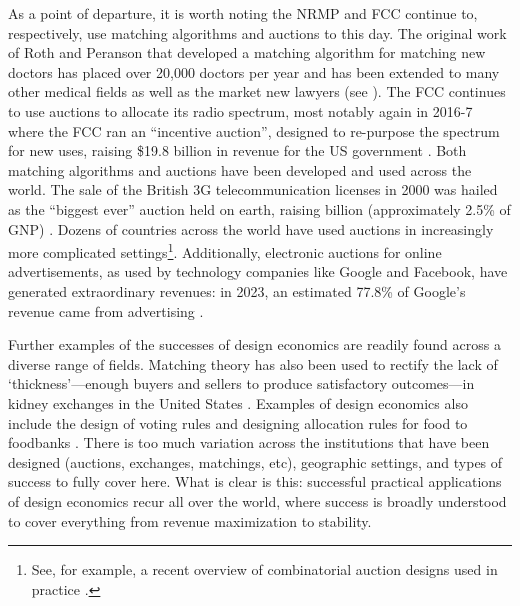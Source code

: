 As a point of departure, it is worth noting the NRMP and FCC continue to, respectively, use matching algorithms and auctions to this day. The original work of Roth and Peranson \autocite*{roth1999} that developed a matching algorithm for matching new doctors has placed over 20,000 doctors per year and has been extended to many other medical fields as well as the market new lawyers (see \cite[1346]{roth2002}). The FCC continues to use auctions to allocate its radio spectrum, most notably again in 2016-7 where the FCC ran an ``incentive auction'', designed to re-purpose the spectrum for new uses, raising \$19.8 billion in revenue for the US government \autocite{fcc_incentive}. Both matching algorithms and auctions have been developed and used across the world. The sale of the British 3G telecommunication licenses in 2000 was hailed as the ``biggest ever'' auction held on earth, raising  billion (approximately 2.5\% of GNP) \autocite{binmore2002}. Dozens of countries across the world have used auctions in increasingly more complicated settings\footnote{See, for example, a recent overview of combinatorial auction designs used in practice \autocite{palacios2022}.}. Additionally, electronic auctions for online advertisements, as used by technology companies like Google and Facebook, have generated extraordinary revenues: in 2023, an estimated 77.8\% of Google's revenue came from advertising \autocite[63]{alphabet2024}. 

Further examples of the successes of design economics are readily found across a diverse range of fields. Matching theory has also been used to rectify the lack of `thickness'---enough buyers and sellers to produce satisfactory outcomes---in kidney exchanges in the United States \autocite{roth2007hbs}. Examples of design economics also include the design of voting rules \autocite{lackner2021} and designing allocation rules for food to foodbanks \autocite{prendergast2022}. There is too much variation across the institutions that have been designed (auctions, exchanges, matchings, etc), geographic settings, and types of success to fully cover here. What is clear is this: successful practical applications of design economics recur all over the world, where success is broadly understood to cover everything from revenue maximization to stability. 

